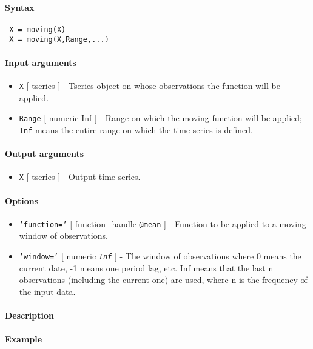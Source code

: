 


	\paragraph{Syntax}
 
 \begin{verbatim}
 X = moving(X)
 X = moving(X,Range,...)
 \end{verbatim}
 
 \paragraph{Input arguments}
 
 \begin{itemize}
 \item
   \texttt{X} {[} tseries {]} - Tseries object on whose observations the
   function will be applied.
 \item
   \texttt{Range} {[} numeric \textbar{} Inf {]} - Range on which the
   moving function will be applied; \texttt{Inf} means the entire range
   on which the time series is defined.
 \end{itemize}
 
 \paragraph{Output arguments}
 
 \begin{itemize}
 \item
   \texttt{X} {[} tseries {]} - Output time series.
 \end{itemize}
 
 \paragraph{Options}
 
 \begin{itemize}
 \item
   \texttt{'function='} {[} function\_handle \textbar{} \texttt{@mean}
   {]} - Function to be applied to a moving window of observations.
 \item
   \texttt{'window='} {[} numeric \textbar{} \emph{\texttt{Inf}} {]} -
   The window of observations where 0 means the current date, -1 means
   one period lag, etc. Inf means that the last n observations (including
   the current one) are used, where n is the frequency of the input data.
 \end{itemize}
 
 \paragraph{Description}
 
 \paragraph{Example}


